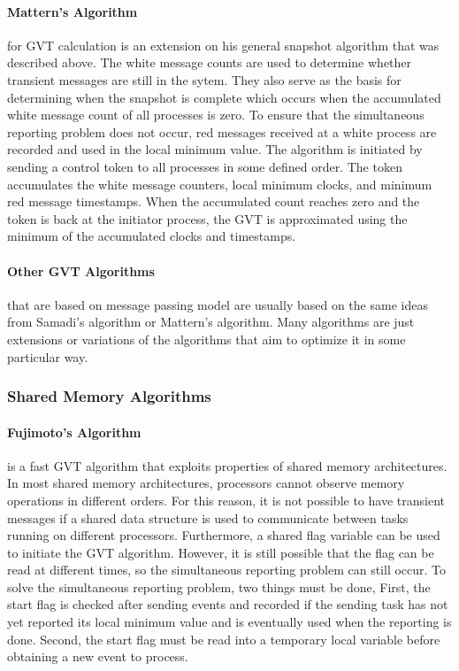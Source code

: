 \documentclass[11pt]{book}
\begin{document}
\paragraph{Mattern's Algorithm}\cite{mattern-93} for GVT calculation is an extension on his
general snapshot algorithm that was described above. The white message counts are used to
determine whether transient messages are still in the sytem. They also serve as the basis
for determining when the snapshot is complete which occurs when the accumulated white message
count of all processes is zero. To ensure that the simultaneous reporting problem does not
occur, red messages received at a white process are recorded and used in the local minimum
value. The algorithm is initiated by sending a control token to all processes in some defined
order. The token accumulates the white message counters, local minimum clocks, and minimum
red message timestamps. When the accumulated count reaches zero and the token is back at
the initiator process, the GVT is approximated using the minimum of the accumulated clocks
and timestamps.

\paragraph{Other GVT Algorithms} that are based on message passing model are usually based
on the same ideas from Samadi's algorithm or Mattern's algorithm. Many algorithms are just
extensions or variations of the algorithms that aim to optimize it in some particular way.

\subsubsection{Shared Memory Algorithms}

\paragraph{Fujimoto's Algorithm}\cite{fujimoto-94} is a fast GVT algorithm that exploits
properties of shared memory architectures. In most shared memory architectures, processors
cannot observe memory operations in different orders. For this reason, it is not possible
to have transient messages if a shared data structure is used to communicate between tasks
running on different processors. Furthermore, a shared flag variable can be used to initiate
the GVT algorithm. However, it is still possible that the flag can be read at different
times, so the simultaneous reporting problem can still occur. To solve the simultaneous
reporting problem, two things must be done, First, the start flag is checked after sending
events and recorded if the sending task has not yet reported its local minimum value and
is eventually used when the reporting is done. Second, the start flag must be read into a
temporary local variable before obtaining a new event to process.
\end{document}
